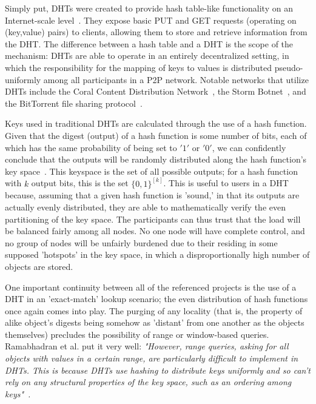 \documentclass[10pt]{IEEEtran}
\begin{document}
\par Simply put, DHTs were created to provide hash table-like functionality on an Internet-scale level~\cite{Ratnasamy:2001wn}. They expose basic PUT and GET requests (operating on (key,value) pairs) to clients, allowing them to store and retrieve information from the DHT. The difference between a hash table and a DHT is the scope of the mechanism: DHTs are able to operate in an entirely decentralized setting, in which the responsibility for the mapping of keys to values is distributed pseudo-uniformly among all participants in a P2P network. Notable networks that utilize DHTs include the Coral Content Distribution Network~\cite{Freedman:2004vb}, the Storm Botnet~\cite{Holz:2008uk}, and the BitTorrent file sharing protocol~\cite{Cohen:y1_8mBnw}.

\par Keys used in traditional DHTs are calculated through the use of a hash function. Given that the digest (output) of a hash function is some number of bits, each of which has the same probability of being set to $'1'$ or $'0'$, we can confidently conclude that the outputs will be randomly distributed along the hash function's key space~\cite{Stoica:2001dj}. This keyspace is the set of all possible outputs; for a hash function with $k$ output bits, this is the set $\{0,1\}^{[k]}$. This is useful to users in a DHT because, assuming that a given hash function is 'sound,' in that its outputs are actually evenly distributed, they are able to mathematically verify the even partitioning of the key space. The participants can thus trust that the load will be balanced fairly among all nodes. No one node will have complete control, and no group of nodes will be unfairly burdened due to their residing in some supposed 'hotspots' in the key space, in which a disproportionally high number of objects are stored.

\par One important continuity between all of the referenced projects is the use of a DHT in an 'exact-match' lookup scenario; the even distribution of hash functions once again comes into play. The purging of any locality (that is, the property of alike object's digests being somehow as 'distant' from one another as the objects themselves) precludes the possibility of range or window-based queries. Ramabhadran et al. put it very well: \textit{"However, range queries, asking for all objects with values in a certain range, are particularly difficult to implement in DHTs. This is because DHTs use hashing to distribute keys uniformly and so can't rely on any structural properties of the key space, such as an ordering among keys"}~\cite{Ramabhadran:2004tr}\textit{.}
\end{document}
